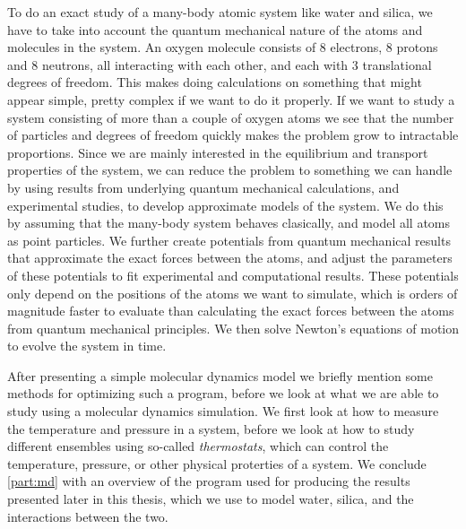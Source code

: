 
To do an exact study of a many-body atomic system like water and silica, we have to take into account the quantum mechanical nature of the atoms and molecules in the system. An oxygen molecule consists of 8 electrons, 8 protons and 8 neutrons, all interacting with each other, and each with 3 translational degrees of freedom. This makes doing calculations on something that might appear simple, pretty complex if we want to do it properly. If we want to study a system consisting of more than a couple of oxygen atoms we see that the number of particles and degrees of freedom quickly makes the problem grow to intractable proportions. Since we are mainly interested in the equilibrium and transport properties of the system, we can reduce the problem to something we can handle by using results from underlying quantum mechanical calculations, and experimental studies, to develop approximate models of the system. We do this by assuming that the many-body system behaves clasically, and model all atoms as point particles. We further create potentials from quantum mechanical results that approximate the exact forces between the atoms, and adjust the parameters of these potentials to fit experimental and computational results. These potentials only depend on the positions of the atoms we want to simulate, which is orders of magnitude faster to evaluate than calculating the exact forces between the atoms from quantum mechanical principles. We then solve Newton's equations of motion to evolve the system in time.


After presenting a simple molecular dynamics model we briefly mention some methods for optimizing such a program, before we look at what we are able to study using a molecular dynamics simulation. We first look at how to measure the temperature and pressure in a system, before we look at how to study different ensembles using so-called \emph{thermostats}, which can control the temperature, pressure, or other physical proterties of a system. We conclude \cref{part:md} with an overview of the program used for producing the results presented later in this thesis, which we use to model water, silica, and the interactions between the two.